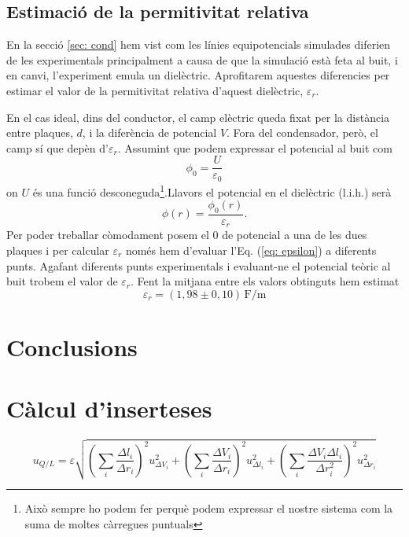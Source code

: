 \documentclass[11pt]{article}
\begin{document}
\subsection{Estimació de la permitivitat relativa}
En la secció \ref{sec: cond} hem vist com les línies equipotencials simulades diferien de les experimentals principalment a causa de que la simulació està feta al buit, i en canvi, l'experiment emula un dielèctric. Aprofitarem aquestes diferencies per estimar el valor de la permitivitat relativa d'aquest dielèctric, $\varepsilon_r$.

En el cas ideal, dins del conductor, el camp elèctric queda fixat per la distància entre plaques, $d$, i la diferència de potencial $V$. Fora del condensador, però, el camp sí que depèn d'$\varepsilon_r$. 
Assumint que podem expressar el potencial al buit com 
\begin{equation}
    \phi_0 = \frac{U}{\varepsilon_0}
\end{equation} 
on $U$ és una funció desconeguda\footnote{Això sempre ho podem fer perquè podem expressar el nostre sistema com la suma de moltes càrregues puntuals}.Llavors el potencial en el dielèctric (l.i.h.) serà
\begin{equation}
    \phi(r)=\frac{\phi_0(r)}{\varepsilon_r}.
    \label{eq: epsilon}
\end{equation} 
Per poder treballar còmodament posem el 0 de potencial a una de les dues plaques i per calcular $\varepsilon_r$ només hem d'evaluar l'Eq. (\ref{eq: epsilon}) a diferents punts. Agafant diferents punts experimentals i evaluant-ne el potencial teòric al buit trobem el valor de $\varepsilon_r$. Fent la mitjana entre els valors obtinguts hem estimat
\begin{equation}
    \varepsilon_r=(1,98 \pm 0,10)\, \mathrm{F/m}
\end{equation}
\section{Conclusions}\label{sec: conc}

\label{sec: annex}
\section{Càlcul d'inserteses}

\begin{equation}
    u_{Q/L} = \varepsilon \sqrt{
        \left( \sum_i \frac{\Delta l_i}{\Delta r_i} \right)^2 u^2_{\Delta V_i} +
        \left( \sum_i \frac{\Delta V_i}{\Delta r_i} \right)^2 u^2_{\Delta l_i} +
        \left( \sum_i \frac{\Delta V_i \Delta l_i}{\Delta r_i^2} \right)^2 u^2_{\Delta r_i}}
        \label{eq: ins_q}
\end{equation}
\end{document}
